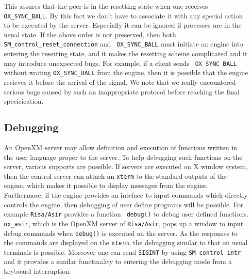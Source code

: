 This assures that the peer is in the resetting state when one receives
{\tt OX\_SYNC\_BALL}. By this fact we don't have to associate it with
any special action to be executed by the server. Especially it can be
ignored if processes are in the usual state. If the above order is not
preserved, then both {\tt SM\_control\_reset\_connection} and {\tt
OX\_SYNC\_BALL} must initiate an engine into entering the resetting
state, and it makes the resetting scheme complicated and it may
introduce unexpected bugs. For example, if a client sends {\tt
OX\_SYNC\_BALL} without waiting {\tt OX\_SYNC\_BALL} from the engine,
then it is possible that the engine recieves it before the arrival of
the signal. We note that we really encountered serious bugs caused
by such an inappropriate protocol before reaching the final specicication.

\subsection{Debugging}
An OpenXM server may allow definition and execution of functions
written in the user language proper to the server.  To help debugging
such functions on the server, various supports are possible. If
servers are executed on X window system, then the control server can
attach an {\tt xterm} to the standard outputs of the engine, which
makes it possible to display messages from the engine. Furthermore, if
the engine provides an inteface to input commands which directly
controls the engine, then debugging of user define programs will be
possible. For example {\tt Risa/Asir} provides a function {\tt
debug()} to debug user defined functions. {\tt ox\_asir}, which is
the OpenXM server of {\tt Risa/Asir}, pops up a window to input
debug commands when {\tt debug()} is executed on the server.
As the responses to the commands are displayed on the {\tt xterm},
the debugging similar to that on usual terminals is possible.
Moreover one can send {\tt SIGINT} by using {\tt SM\_control\_intr}
and it provides a similar functinality to entering the debugging
mode from a keyboard interruption.
